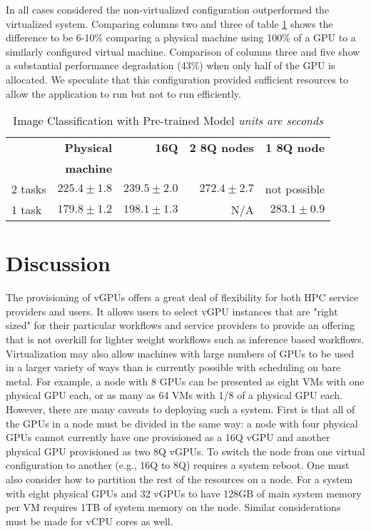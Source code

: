\documentclass[acmsmall, authorversion]{acmart}
\begin{document}
In all cases considered the non-virtualized configuration outperformed the virtualized system.
Comparing columns two and three of table \ref{tab:vggclass} shows the difference to be 6-10\% comparing a physical machine using 100\% of a GPU to a similarly configured virtual machine.
Comparison of columns three and five show a substantial performance degradation (43\%) when only half of the GPU is allocated. We speculate that this configuration provided sufficient resources to allow the application to run but not to run efficiently.



\begin{table}[ht]
\centering
\caption{Image Classification with Pre-trained Model {\em units are seconds}}
\label{tab:vggclass}
\begin{tabular}{lrrrr}
\toprule
& \textbf{Physical} & \textbf{16Q} & \textbf{2 8Q nodes} & \textbf{1 8Q node} \\
& \textbf{machine} \\ \midrule
2 tasks & $225.4 \pm 1.8$  & $239.5 \pm 2.0$ & $272.4 \pm 2.7$    & not possible \\
1 task  & $179.8 \pm 1.2$  & $198.1 \pm 1.3$ & N/A                & $283.1 \pm 0.9$ \\ \bottomrule
\end{tabular}

\end{table}


\section{Discussion}\label{sec:discussion}
The provisioning of vGPUs offers a great deal of flexibility for both HPC service providers and users. It allows users to select vGPU instances that are "right sized" for their particular workflows and service providers to provide an offering that is not overkill for lighter weight workflows such as inference based workflows. Virtualization may also allow machines with large numbers of GPUs to be used in a larger variety of ways than is currently possible with scheduling on bare metal. For example, a node with 8 GPUs can be presented as eight VMs with one physical GPU each, or as many as 64 VMs with 1/8 of a physical GPU each. However, there are many caveats to deploying such a system. First is that all of the GPUs in a node must be divided in the same way: a node with four physical GPUs cannot currently have one provisioned as a 16Q vGPU and another physical GPU provisioned as two 8Q vGPUs. To switch the node from one virtual configuration to another (e.g., 16Q to 8Q) requires a system reboot. One must also consider how to partition the rest of the resources on a node. For a system with eight physical GPUs and 32 vGPUs to have 128GB of main system memory per VM requires 1TB of system memory on the node. Similar considerations must be made for vCPU cores as well.
\end{document}
